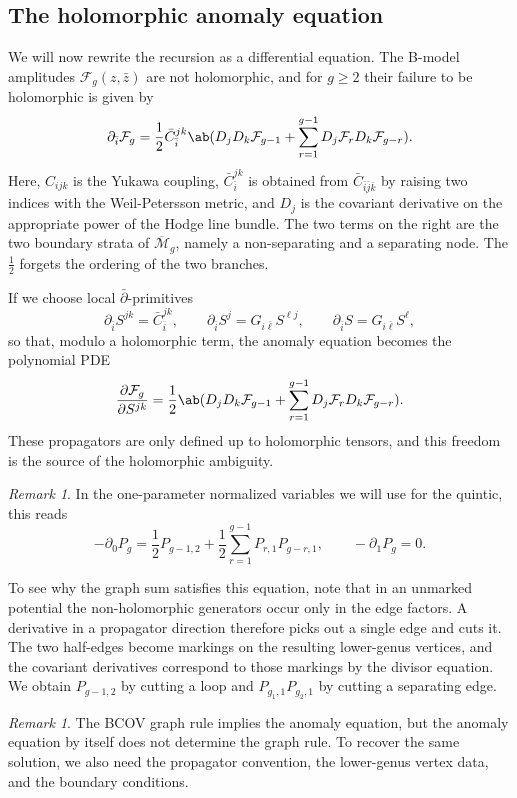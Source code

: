 \documentclass{amsart}
\theoremstyle{definition}
\theoremstyle{remark}
\newtheorem{rmk}[thm]{Remark}
\theoremstyle{plain}
\theoremstyle{definition}
\theoremstyle{remark}
\newcommand{\Mbar}{\overline{\mathcal{M}}}
\newcommand{\mc}[1]{\mathcal{#1}}
\newcommand{\1}{\mathbf{1}}
\newcommand{\2}{\mathbf{2}}
\newcommand{\3}{\mathbf{3}}
\begin{document}
\subsection{The holomorphic anomaly equation}%
\label{sub:The holomorphic anomaly equation}

We will now rewrite the recursion as a differential equation. The B-model amplitudes \(\mc{F}_g(z,\bar{z})\) are not holomorphic, and for \(g \geq 2\) their failure to be holomorphic is given by
\[ \partial_{\bar{i}} \mc{F}_g = \frac{1}{2}\bar{C}_{\bar{i}}^{jk}\ab( D_j D_k \mc{F}_{g-1} + \sum_{r=1}^{g-1} D_j \mc{F}_r D_k \mc{F}_{g-r} ). \]
Here, \(C_{ijk}\) is the Yukawa coupling, \(\bar{C}_{\bar{i}}^{jk}\) is obtained from \(\bar{C}_{\bar{i}\bar{j}\bar{k}}\) by raising two indices with the Weil-Petersson metric, and \(D_j\) is the covariant derivative on the appropriate power of the Hodge line bundle. The two terms on the right are the two boundary strata of \(\Mbar_g\), namely a non-separating and a separating node. The \(\frac{1}{2}\) forgets the ordering of the two branches.

If we choose local \(\bar{\partial}\)-primitives
\[ \partial_{\bar{i}}S^{jk} = \bar{C}_{\bar{i}}^{jk}, \qquad \partial_{\bar{i}}S^j = G_{i\bar{\ell}}S^{\ell j}, \qquad \partial_{\bar{i}}S = G_{i\bar{\ell}}S^{\ell}, \]
so that, modulo a holomorphic term, the anomaly equation becomes the polynomial PDE
\[ \pdv{\mc{F}_g}{S^{jk}} = \frac{1}{2}\ab( D_jD_k \mc{F}_{g-1} + \sum_{r=1}^{g-1} D_j \mc{F}_r D_k \mc{F}_{g-r} ). \]
These propagators are only defined up to holomorphic tensors, and this freedom is the source of the holomorphic ambiguity.

\begin{rmk}
    In the one-parameter normalized variables we will use for the quintic, this reads
    \[ -\partial_0 P_g = \frac{1}{2}P_{g-1,2} + \frac{1}{2}\sum_{r=1}^{g-1}P_{r,1}P_{g-r,1}, \qquad -\partial_1 P_g = 0. \]
\end{rmk}

To see why the graph sum satisfies this equation, note that in an unmarked potential the non-holomorphic generators occur only in the edge factors. A derivative in a propagator direction therefore picks out a single edge and cuts it. The two half-edges become markings on the resulting lower-genus vertices, and the covariant derivatives correspond to those markings by the divisor equation. We obtain \(P_{g-1,2}\) by cutting a loop and \(P_{g_1,1}P_{g_2,1}\) by cutting a separating edge.

\begin{rmk}
    The BCOV graph rule implies the anomaly equation, but the anomaly equation by itself does not determine the graph rule. To recover the same solution, we also need the propagator convention, the lower-genus vertex data, and the boundary conditions.
\end{rmk}
\end{document}
